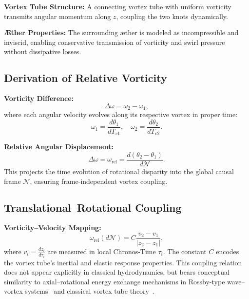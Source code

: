 \documentclass[12pt]{article}
\begin{document}
    \textbf{Vortex Tube Structure:} A connecting vortex tube with uniform vorticity transmits angular momentum along \( z \), coupling the two knots dynamically.

    \textbf{Æther Properties:} The surrounding æther is modeled as incompressible and inviscid, enabling conservative transmission of vorticity and swirl pressure without dissipative losses.

    \subsection{Derivation of Relative Vorticity}

    \textbf{Vorticity Difference:}
    \begin{equation*}
        \Delta \omega = \omega_2 - \omega_1,
    \end{equation*}
    where each angular velocity evolves along its respective vortex in proper time:
    \begin{equation*}
        \omega_1 = \frac{d\theta_1}{dT_{v1}}, \quad \omega_2 = \frac{d\theta_2}{dT_{v2}}.
    \end{equation*}

    \textbf{Relative Angular Displacement:}
    \begin{equation*}
        \Delta \omega = \omega_\text{rel} = \frac{d(\theta_2 - \theta_1)}{d\mathcal{N}}.
    \end{equation*}
    This projects the time evolution of rotational disparity into the global causal frame \( \mathcal{N} \), ensuring frame-independent vortex coupling.

    \subsection*{Translational–Rotational Coupling}

    \textbf{Vorticity–Velocity Mapping:}
    \begin{equation*}
        \omega_\text{rel}(d\mathcal{N}) = C \frac{v_2 - v_1}{|z_2 - z_1|},
    \end{equation*}
    where \( v_i = \frac{dz_i}{d\tau_i} \) are measured in local Chronos-Time \( \tau_i \). The constant \( C \) encodes the vortex tube’s
inertial and elastic response properties. This coupling relation does not appear explicitly in classical hydrodynamics, but bears conceptual similarity to axial–rotational energy exchange mechanisms in Rossby-type wave–vortex systems~\cite{rossby1939} and classical vortex tube theory~\cite{lamb1932,batchelor2000}.
\end{document}
